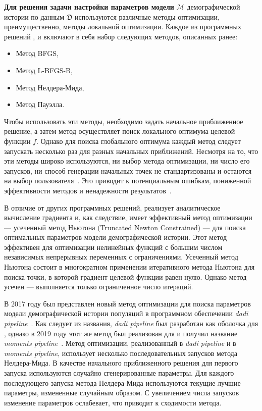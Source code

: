 \textbf{Для решения задачи настройки параметров модели} $\mathcal{M}$ демографической истории по данным $\mathfrak{D}$ используются различные методы оптимизации, преимущественно, методы локальной оптимизации.
Каждое из программных решений \dadi, \moments и \momentsLD включают в себя набор следующих методов, описанных ранее:
\begin{itemize}
    \item Метод BFGS,
    \item Метод L-BFGS-B,
    \item Метод Нелдера-Мида,
    \item Метод Пауэлла.
\end{itemize}
Чтобы использовать эти методы, необходимо задать начальное приближенное решение, а затем метод осуществляет поиск локального оптимума целевой функции $f$.
Однако для поиска глобального оптимума каждый метод следует запускать несколько раз для разных начальных приближений.
Несмотря на то, что эти методы широко используются, ни выбор метода оптимизации, ни число его запусков, ни способ генерации начальных точек не стандартизованы и остаются на выбор пользователя~\cite{gutenkunst2009inferring, jouganous2017inferring, noskova2020gadma}.
Это приводит к потенциальным ошибкам, пониженной эффективности методов и ненадежности результатов~\cite{noskova2020gadma}.

В отличие от других программных решений, \momi реализует аналитическое вычисление градиента и, как следствие, имеет эффективный метод оптимизации --- усеченный метод Ньютона (Truncated Newton Constrained) --- для поиска оптимальных параметров модели демографической истории.
Этот метод эффективен для оптимизации нелинейных функций с большим числом независимых непрерывных переменных с ограничениями.
Усеченный метод Ньютона состоит в многократном применении итеративного метода Ньютона для поиска точки, в которой градиент целевой функции равен нулю.
Однако метод усечен --- выполняется только ограниченное число итераций.

В 2017 году был представлен новый метод оптимизации для поиска параметров модели демографической истории популяций в программном обеспечении \textit{dadi pipeline}~\cite{portik2017evaluating}.
Как следует из названия, \textit{dadi pipeline} был разработан как оболочка для \dadi, однако в 2019 году этот же метод был реализован для \moments и получил название \textit{moments pipeline}~\cite{leache2019exploring}.
Метод оптимизации, реализованный в \textit{dadi pipeline} и в \textit{moments pipeline}, использует несколько последовательных запусков метода Нелдера-Мида.
В качестве начального приближенного решения для первого запуска используются случайно сгенерированные параметры.
Для каждого последующего запуска метода Нелдера-Мида используются текущие лучшие параметры, измененные случайным образом.
С увеличением числа запусков изменение параметров ослабевает, что приводит к сходимости метода.

